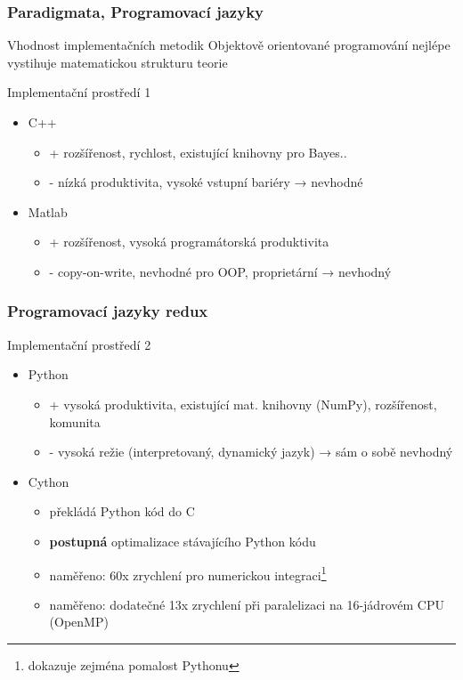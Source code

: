 \documentclass[12pt]{beamer}
\begin{document}
\begin{frame}
	\frametitle{Paradigmata, Programovací jazyky}

	\begin{block}{Vhodnost implementačních metodik}
		Objektově orientované programování nejlépe vystihuje matematickou strukturu teorie
	\end{block}

	\begin{block}{Implementační prostředí 1}
		\begin{itemize}
			\item C++
			\begin{itemize}
				\item + rozšířenost, rychlost, existující knihovny pro Bayes..
				\item - nízká produktivita, vysoké vstupní bariéry → nevhodné
			\end{itemize}
			\item Matlab
			\begin{itemize}
				\item + rozšířenost, vysoká programátorská produktivita
				\item - copy-on-write, nevhodné pro OOP, proprietární → nevhodný
			\end{itemize}
		\end{itemize}
	\end{block}
\end{frame}

\begin{frame}
	\frametitle{Programovací jazyky redux}

	\begin{block}{Implementační prostředí 2}
		\begin{itemize}
			\item Python
			\begin{itemize}
				\item + vysoká produktivita, existující mat. knihovny (NumPy), rozšířenost, komunita
				\item - vysoká režie (interpretovaný, dynamický jazyk) → sám o sobě nevhodný
			\end{itemize}
			\item Cython
			\begin{itemize}
				\item překládá Python kód do C
				\item \textbf{postupná} optimalizace stávajícího Python kódu
				\item naměřeno: 60x zrychlení pro numerickou integraci\footnote{dokazuje zejména
pomalost Pythonu}
				\item naměřeno: dodatečné 13x zrychlení při paralelizaci na 16-jádrovém CPU (OpenMP)
			\end{itemize}
		\end{itemize}
	\end{block}
\end{frame}
\end{document}

